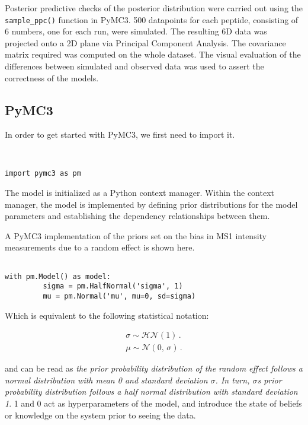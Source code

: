 Posterior predictive checks of the posterior distribution were carried out using the \texttt{sample\_ppc()} function in PyMC3. 500 datapoints for each peptide, consisting of 6 numbers, one for each run, were simulated. The resulting 6D data was projected onto a 2D plane via Principal Component Analysis. The covariance matrix required was computed on the whole dataset. The visual evaluation of the differences between simulated and observed data was used to assert the correctness of the models.

\subsection{PyMC3}

In order to get started with PyMC3, we first need to import it.

\begin{verbatim}


import pymc3 as pm              
\end{verbatim}

The model is initialized as a Python context manager. Within the context manager, the model is implemented by defining prior distributions for the model parameters and establishing the dependency relationships between them.

A PyMC3 implementation of the priors set on the bias in \ac{MS1} intensity measurements due to a random effect is shown here.

\begin{verbatim}

with pm.Model() as model:             
         sigma = pm.HalfNormal('sigma', 1)
         mu = pm.Normal('mu', mu=0, sd=sigma)
\end{verbatim}


Which is equivalent to the following statistical notation:

\begin{align}
\sigma \sim \mathcal{HN}(1)\,.  \\
\mu \sim \mathcal{N}(0,\,\sigma)\,.
\end{align}

and can be read as \textit{the prior probability distribution of the random effect follows a normal distribution with mean 0 and standard deviation $\sigma$. In turn, $\sigma$\textquotesingle s prior probability distribution follows a half normal distribution with standard deviation 1}. 1 and 0 act as hyperparameters of the model, and introduce the state of beliefs or knowledge on the system prior to seeing the data.


